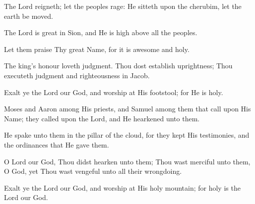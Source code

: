 The Lord reigneth; let the peoples rage: He sitteth upon the cherubim, let the earth be moved.

The Lord is great in Sion, and He is high above all the peoples.

Let them praise Thy great Name, for it is awesome and holy.

The king's honour loveth judgment. Thou dost establish uprightness; Thou executeth judgment and righteousness in Jacob.

Exalt ye the Lord our God, and worship at His footstool; for He is holy.

Moses and Aaron among His priests, and Samuel among them that call upon His Name; they called upon the Lord, and He hearkened unto them.

He spake unto them in the pillar of the cloud, for they kept His testimonies, and the ordinances that He gave them.

O Lord our God, Thou didst hearken unto them; Thou wast merciful unto them, O God, yet Thou wast vengeful unto all their wrongdoing.

Exalt ye the Lord our God, and worship at His holy mountain; for holy is the Lord our God.
